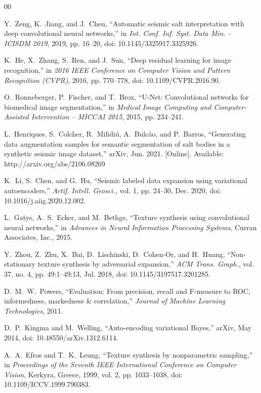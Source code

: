 \documentclass{ieeeaccess}
\begin{document}
\begin{thebibliography}{00}

Y.~Zeng, K.~Jiang, and J.~Chen, ``Automatic seismic salt interpretation with deep convolutional neural networks,'' in \emph{Int. Conf. Inf. Syst. Data Min. - ICISDM 2019}, 2019, pp. 16--20, doi: 10.1145/3325917.3325926.

K.~He, X.~Zhang, S.~Ren, and J.~Sun, ``Deep residual learning for image recognition,'' in \emph{2016 IEEE Conference on Computer Vision and Pattern Recognition (CVPR)}, 2016, pp. 770--778, doi: 10.1109/CVPR.2016.90.

O.~Ronneberger, P.~Fischer, and T.~Brox, ``U-Net: Convolutional networks for biomedical image segmentation,'' in \emph{Medical Image Computing and Computer-Assisted Intervention -- MICCAI 2015}, 2015, pp. 234--241.

L.~Henriques, S.~Colcher, R.~Milidiú, A.~Bulcão, and P.~Barros, ``Generating data augmentation samples for semantic segmentation of salt bodies in a synthetic seismic image dataset,'' arXiv, Jun. 2021. [Online]. Available: http://arxiv.org/abs/2106.08269

K.~Li, S.~Chen, and G.~Hu, ``Seismic labeled data expansion using variational autoencoders,'' \emph{Artif. Intell. Geosci.}, vol. 1, pp. 24--30, Dec. 2020, doi: 10.1016/j.aiig.2020.12.002.

L.~Gatys, A.~S.~Ecker, and M.~Bethge, ``Texture synthesis using convolutional neural networks,'' in \emph{Advances in Neural Information Processing Systems}, Curran Associates, Inc., 2015.

Y.~Zhou, Z.~Zhu, X.~Bai, D.~Lischinski, D.~Cohen-Or, and H.~Huang, ``Non-stationary texture synthesis by adversarial expansion,'' \emph{ACM Trans. Graph.}, vol. 37, no. 4, pp. 49:1--49:13, Jul. 2018, doi: 10.1145/3197517.3201285.

D.~M.~W.~Powers, ``Evaluation: From precision, recall and F-measure to ROC, informedness, markedness \& correlation,'' \emph{Journal of Machine Learning Technologies}, 2011.

D.~P.~Kingma and M.~Welling, ``Auto-encoding variational Bayes,'' arXiv, May 2014, doi: 10.48550/arXiv.1312.6114.

A.~A.~Efros and T.~K.~Leung, ``Texture synthesis by nonparametric sampling,'' in \emph{Proceedings of the Seventh IEEE International Conference on Computer Vision}, Kerkyra, Greece, 1999, vol. 2, pp. 1033--1038, doi: 10.1109/ICCV.1999.790383.


\end{thebibliography}
\end{document}
